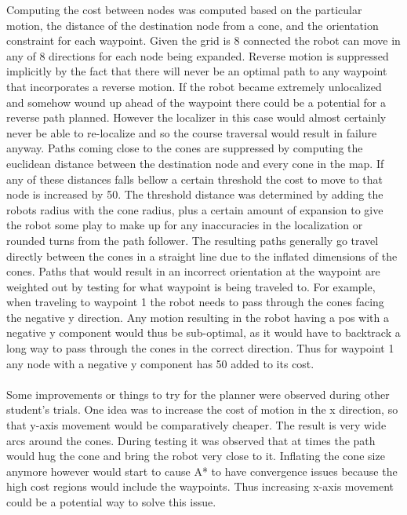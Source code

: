 \documentclass[letterpaper,12pt]{article}
\begin{document}
Computing the cost between nodes was computed based on the particular motion, the distance of the destination node from a cone, and the orientation constraint for each waypoint. Given the grid is 8 connected the robot can move in any of 8 directions for each node being expanded. Reverse motion is suppressed implicitly by the fact that there will never be an optimal path to any waypoint that incorporates a reverse motion. If the robot became extremely unlocalized and somehow wound up ahead of the waypoint there could be a potential for a reverse path planned. However the localizer in this case would almost certainly never be able to re-localize and so the course traversal would result in failure anyway. Paths coming close to the cones are suppressed by computing the euclidean distance between the destination node and every cone in the map. If any of these distances falls bellow a certain threshold the cost to move to that node is increased by 50. The threshold distance was determined by adding the robots radius with the cone radius, plus a certain amount of expansion to give the robot some play to make up for any inaccuracies in the localization or rounded turns from the path follower. The resulting paths generally go travel directly between the cones in a straight line due to the inflated dimensions of the cones. Paths that would result in an incorrect orientation at the waypoint are weighted out by testing for what waypoint is being traveled to. For example, when traveling to waypoint 1 the robot needs to pass through the cones facing the negative y direction. Any motion resulting in the robot having a pos with a negative y component would thus be sub-optimal, as it would have to backtrack a long way to pass through the cones in the correct direction. Thus for waypoint 1 any node with a negative y component has 50 added to its cost.
\\\\
Some improvements or things to try for the planner were observed during other student's trials. One idea was to increase the cost of motion in the x direction, so that y-axis movement would be comparatively cheaper. The result is very wide arcs around the cones. During testing it was observed that at times the path would hug the cone and bring the robot very close to it. Inflating the cone size anymore however would start to cause A* to have convergence issues because the high cost regions would include the waypoints. Thus increasing x-axis movement could be a potential way to solve this issue. 
\end{document}
